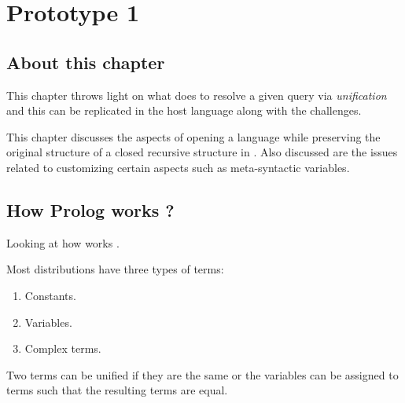 \documentclass[proposal.tex]{subfiles}
\begin{document}
\section{Prototype 1}{\label{proto1}}

\subsection{About this chapter}
This chapter throws light on what  does to resolve a given query via \textit{unification} and this can be replicated in
the host language along with the challenges.  

This chapter discusses the aspects of opening a language while preserving the original structure of a closed recursive structure in 
. Also discussed are the issues related to customizing certain aspects such as meta-syntactic variables.

\subsection{How Prolog works ?}
Looking at how  works \cite{webiste:learnprolognow}.

Most  distributions have three types of terms:
\begin{enumerate}
\item Constants.

\item Variables.

\item Complex terms.
\end{enumerate}

Two terms can be unified if they are the same or the variables can be assigned to terms such that the resulting terms are equal.
\end{document}
